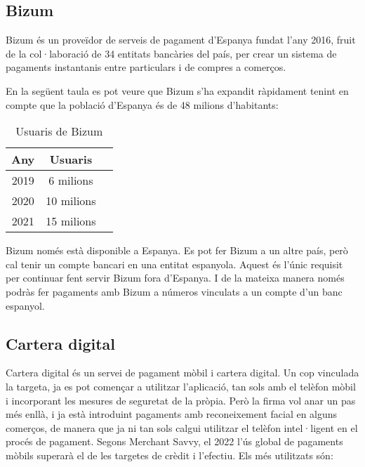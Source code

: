 
\subsection*{Bizum}



Bizum és un proveïdor de serveis de pagament d'Espanya fundat l'any 2016, fruit de la col·laboració de 34 entitats bancàries del país, per crear un sistema de pagaments instantanis entre particulars i de compres a comerços. 

En la següent taula es pot veure que Bizum s'ha expandit ràpidament tenint en compte que la població d'Espanya és de 48 milions d'habitants: 
\begin{table}[h]
    \centering
    \begin{tabular}{|c|c|c|}
        \hline
        \textbf \textbf{Any} & \textbf{Usuaris} \\
        \hline
        2019 & 6 milions \\
        \hline
        2020 & 10 milions \\
        \hline
        2021 & 15 milions \\
        \hline
    \end{tabular}
    \caption{Usuaris de Bizum}
\end{table}

Bizum només està disponible a Espanya. Es pot fer Bizum a un altre país, però cal tenir un compte bancari en una entitat espanyola. Aquest és l'únic requisit per continuar fent servir Bizum fora d'Espanya. I de la mateixa manera només podràs fer pagaments amb Bizum a números vinculats a un compte d'un banc espanyol.







\subsection*{Cartera digital}

Cartera digital és un servei de pagament mòbil i cartera digital. Un cop vinculada la targeta, ja es pot començar a utilitzar l'aplicació, tan sols amb el telèfon mòbil i incorporant les mesures de seguretat de la pròpia. Però la firma vol anar un pas més enllà, i ja està introduint pagaments amb reconeixement facial en alguns comerços, de manera que ja ni tan sols calgui utilitzar el telèfon intel·ligent en el procés de pagament. Segons Merchant Savvy, el 2022 l'ús global de pagaments mòbils superarà el de les targetes de crèdit i l'efectiu.
Els més utilitzats són:

